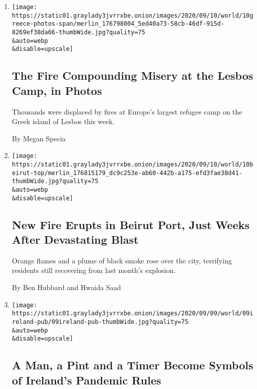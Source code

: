 \begin{enumerate}
\def\labelenumi{\arabic{enumi}.}
\item
  \href{/2020/09/10/world/europe/fire-camp-lesbos-moria-photos.html}{}

  \texttt{[image: https://static01.graylady3jvrrxbe.onion/images/2020/09/10/world/10greece-photos-span/merlin\_176798004\_5ed40a73-58cb-46df-915d-8269ef38da66-thumbWide.jpg?quality=75\\\&auto=webp\\\&disable=upscale]}

  \hypertarget{the-fire-compounding-misery-at-the-lesbos-camp-in-photos}{%
  \subsection{The Fire Compounding Misery at the Lesbos Camp, in
  Photos}\label{the-fire-compounding-misery-at-the-lesbos-camp-in-photos}}

  Thousands were displaced by fires at Europe's largest refugee camp on
  the Greek island of Lesbos this week.

  By Megan Specia
\item
  \href{/2020/09/10/world/middleeast/beirut-port-fire.html}{}

  \texttt{[image: https://static01.graylady3jvrrxbe.onion/images/2020/09/10/world/10beirut-top/merlin\_176815179\_dc9c253e-ab60-442b-a175-efd3fae38d41-thumbWide.jpg?quality=75\\\&auto=webp\\\&disable=upscale]}

  \hypertarget{new-fire-erupts-in-beirut-port-just-weeks-after-devastating-blast}{%
  \subsection{New Fire Erupts in Beirut Port, Just Weeks After
  Devastating
  Blast}\label{new-fire-erupts-in-beirut-port-just-weeks-after-devastating-blast}}

  Orange flames and a plume of black smoke rose over the city,
  terrifying residents still recovering from last month's explosion.

  By Ben Hubbard and Hwaida Saad
\item
  \href{/2020/09/09/world/europe/ireland-pub-viral-photo.html}{}

  \texttt{[image: https://static01.graylady3jvrrxbe.onion/images/2020/09/09/world/09ireland-pub/09ireland-pub-thumbWide.jpg?quality=75\\\&auto=webp\\\&disable=upscale]}

  \hypertarget{a-man-a-pint-and-a-timer-become-symbols-of-irelands-pandemic-rules}{%
  \subsection{A Man, a Pint and a Timer Become Symbols of Ireland's
  Pandemic
  Rules}\label{a-man-a-pint-and-a-timer-become-symbols-of-irelands-pandemic-rules}}


\end{enumerate}
